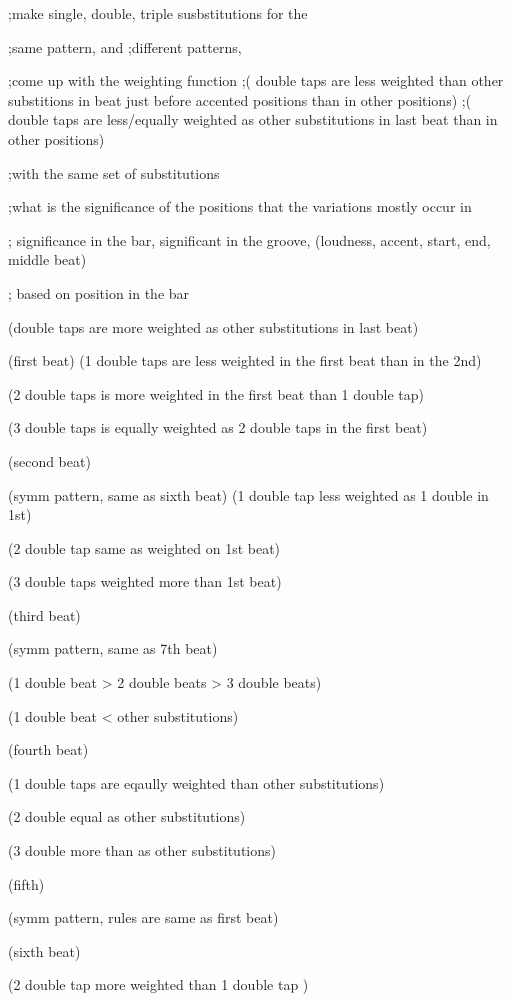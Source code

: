 ;make single, double, triple susbstitutions for the

;same pattern,  and
;different patterns,

;come up with the weighting function
;( double taps are less weighted than other substitions in beat just before accented positions than in other positions)
;( double taps are less/equally weighted as other substitutions in last beat than in other positions)

;with the same set of substitutions

                                       ;what is the significance of the positions that the variations mostly occur in

; significance in the bar, significant in the groove, (loudness, accent, start, end, middle beat)

; based on position in the bar

(double taps are more weighted as other substitutions in last beat)

(first beat)
(1 double taps are less weighted in the first beat than in the 2nd)

(2 double taps is more weighted in the first beat than 1 double tap)

(3 double taps is equally weighted as 2 double taps in the first beat)

(second beat)

(symm pattern, same as sixth beat)
(1 double tap less weighted as 1 double in 1st)

(2 double tap same as weighted on 1st beat)

(3 double taps weighted more than 1st beat)


(third beat)

(symm pattern, same as 7th beat)

(1 double beat > 2 double beats > 3 double beats)

(1 double beat < other substitutions)

(fourth beat)

(1 double taps are eqaully weighted than other substitutions)

(2 double equal as other substitutions)

(3 double more than as other substitutions)

(fifth)

(symm pattern, rules are same as first beat)


(sixth beat)

(2 double tap more weighted than 1 double tap )

